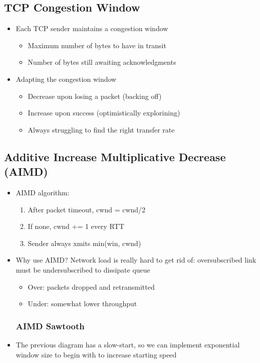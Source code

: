 \subsection{TCP Congestion Window}
\begin{itemize}
	\item Each TCP sender maintains a congestion window
	\begin{itemize}
		\item Maximum number of bytes to have in transit
		\item Number of bytes still awaiting acknowledgments
	\end{itemize}
	\item Adapting the congestion window
	\begin{itemize}
		\item Decrease upon losing a packet (backing off)
		\item Increase upon success (optimistically explorining)
		\item Always struggling to find the right transfer rate
	\end{itemize}
\end{itemize}

\subsection{Additive Increase Multiplicative Decrease (AIMD)}
\begin{itemize}
	\item AIMD algorithm:
	\begin{enumerate}
		\item After packet timeout, cwnd = cwnd/2
		\item If none, cwnd += 1 every RTT
		\item Sender always xmits min(win, cwnd)
	\end{enumerate}
	\item Why use AIMD? Network load is really hard to get rid of: oversubscribed link must be undersubscribed to dissipate queue
	\begin{itemize}
		\item Over: packets dropped and retransmitted
		\item Under: somewhat lower throughput
	\end{itemize}
	\subsubsection{AIMD Sawtooth}
	\item The previous diagram has a slow-start, so we can implement exponential window size to begin with to increase starting speed
\end{itemize}

